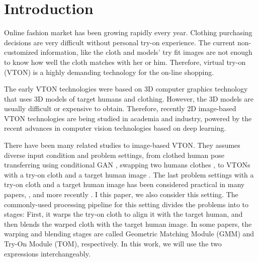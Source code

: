 
\section{Introduction}

Online fashion market has been growing rapidly every year. Clothing purchasing decisions are very difficult without personal try-on experience. The current non-customized information, like the cloth and models' try fit images are not enough to know how well the cloth matches with her or him.   
Therefore, virtual try-on (VTON) is a highly demanding technology for the on-line shopping\cite{zhang2019role}. 

The early VTON technologies were based on 3D computer graphics technology that uses 3D models of target humans and clothing. However, the 3D models are usually  difficult or expensive to obtain. Therefore, recently 2D image-based VTON technologies are being studied in academia and industry, powered by the recent advances in computer vision technologies based on deep learning. 

There have been many related studies to image-based VTON. They assumes diverse input condition and problem settings, from clothed human pose transferring using conditional GAN \cite{ma2017pose}, swapping two humans clothes \cite{jetchev2017conditional}, to VTONs with a try-on cloth and a target human image \cite{Han2017VITONAI}. The last problem settings with a try-on cloth and a target human image has been considered practical in many papers, \cite{Han2017VITONAI,Wang2018TowardCI}, and more recently \cite{Sun2019ImageBasedVT,Yu_2019_ICCV,jae2019viton}. I this paper, we also consider this setting. The commonly-used processing pipeline for this setting divides the problems into to stages: First, it warps the try-on cloth to align it with the target human, and then blends the warped cloth with the
target human image. In some papers, the warping and blending stages are called Geometric Matching Module (GMM) and Try-On Module (TOM), respectively. In this work, we will use the two expressions interchangeably.



